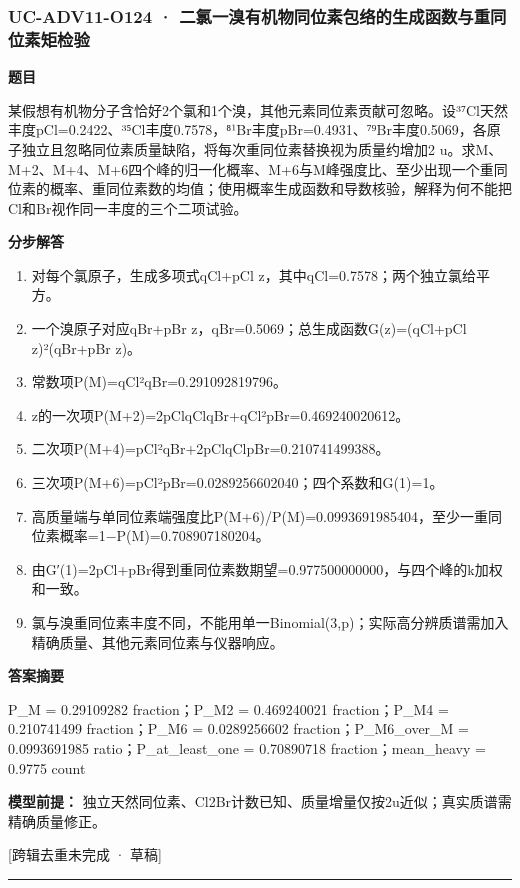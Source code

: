 \documentclass[UTF8,11pt,a4paper]{ctexart}
\begin{document}
\subsubsection*{UC-ADV11-O124 · 二氯一溴有机物同位素包络的生成函数与重同位素矩检验}
\noindent\textbf{题目}\par
某假想有机物分子含恰好2个氯和1个溴，其他元素同位素贡献可忽略。设³⁷Cl天然丰度pCl=0.2422、³⁵Cl丰度0.7578，⁸¹Br丰度pBr=0.4931、⁷⁹Br丰度0.5069，各原子独立且忽略同位素质量缺陷，将每次重同位素替换视为质量约增加2 u。求M、M+2、M+4、M+6四个峰的归一化概率、M+6与M峰强度比、至少出现一个重同位素的概率、重同位素数的均值；使用概率生成函数和导数核验，解释为何不能把Cl和Br视作同一丰度的三个二项试验。\par
\medskip\noindent\textbf{分步解答}
\begin{enumerate}
\item 对每个氯原子，生成多项式qCl+pCl z，其中qCl=0.7578；两个独立氯给平方。
\item 一个溴原子对应qBr+pBr z，qBr=0.5069；总生成函数G(z)=(qCl+pCl z)²(qBr+pBr z)。
\item 常数项P(M)=qCl²qBr=0.291092819796。
\item z的一次项P(M+2)=2pClqClqBr+qCl²pBr=0.469240020612。
\item 二次项P(M+4)=pCl²qBr+2pClqClpBr=0.210741499388。
\item 三次项P(M+6)=pCl²pBr=0.0289256602040；四个系数和G(1)=1。
\item 高质量端与单同位素端强度比P(M+6)/P(M)=0.0993691985404，至少一重同位素概率=1−P(M)=0.708907180204。
\item 由G′(1)=2pCl+pBr得到重同位素数期望=0.977500000000，与四个峰的k加权和一致。
\item 氯与溴重同位素丰度不同，不能用单一Binomial(3,p)；实际高分辨质谱需加入精确质量、其他元素同位素与仪器响应。
\end{enumerate}
\noindent\textbf{答案摘要}\par
P\_M = 0.29109282 fraction；P\_M2 = 0.469240021 fraction；P\_M4 = 0.210741499 fraction；P\_M6 = 0.0289256602 fraction；P\_M6\_over\_M = 0.0993691985 ratio；P\_at\_least\_one = 0.70890718 fraction；mean\_heavy = 0.9775 count\par
\noindent\textbf{模型前提：}
独立天然同位素、Cl2Br计数已知、质量增量仅按2u近似；真实质谱需精确质量修正。\par
\noindent\textcolor{red!65!black}{[跨辑去重未完成 · 草稿]} \par
\medskip\hrule\medskip
{}
\end{document}
